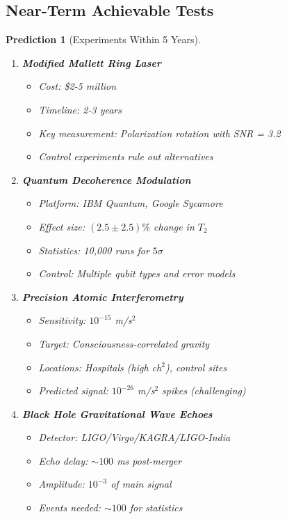\documentclass[11pt]{article}
\newtheorem{prediction}[theorem]{Prediction}
\theoremstyle{definition}
\begin{document}
\subsection{Near-Term Achievable Tests}

\begin{prediction}[Experiments Within 5 Years]
\begin{enumerate}
\item \textbf{Modified Mallett Ring Laser}
   \begin{itemize}
   \item Cost: \$2-5 million
   \item Timeline: 2-3 years
   \item Key measurement: Polarization rotation with SNR = 3.2
   \item Control experiments rule out alternatives
   \end{itemize}

\item \textbf{Quantum Decoherence Modulation}
   \begin{itemize}
   \item Platform: IBM Quantum, Google Sycamore
   \item Effect size: $(2.5 \pm 2.5)\%$ change in $T_2$
   \item Statistics: 10,000 runs for $5\sigma$
   \item Control: Multiple qubit types and error models
   \end{itemize}

\item \textbf{Precision Atomic Interferometry}
   \begin{itemize}
   \item Sensitivity: $10^{-15}$ m/s$^2$
   \item Target: Consciousness-correlated gravity
   \item Locations: Hospitals (high ch$^2$), control sites
   \item Predicted signal: $10^{-26}$ m/s$^2$ spikes (challenging)
   \end{itemize}

\item \textbf{Black Hole Gravitational Wave Echoes}
   \begin{itemize}
   \item Detector: LIGO/Virgo/KAGRA/LIGO-India
   \item Echo delay: $\sim 100$ ms post-merger
   \item Amplitude: $10^{-3}$ of main signal
   \item Events needed: $\sim 100$ for statistics
   \end{itemize}


\end{enumerate}
\end{prediction}
\end{document}
